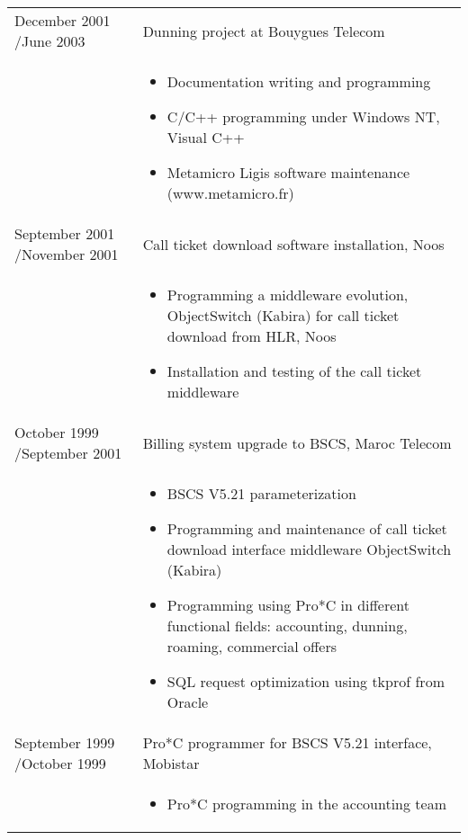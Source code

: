 \documentclass[a4paper,11pt]{letter}
\begin{document}
\begin{tabular}{p{}p{}}
December 2001 \slash June 2003 & Dunning project at Bouygues Telecom \\
	

& \begin{itemize}
\item     Documentation writing and programming 
\item     C/C++ programming under Windows NT, Visual C++
\item     Metamicro Ligis software maintenance (www.metamicro.fr)
\end{itemize} \\
	

September 2001 \slash November 2001 & Call ticket download software installation, Noos \\

& \begin{itemize}
\item     Programming a middleware evolution, ObjectSwitch (Kabira) for call ticket download from HLR, Noos
\item     Installation and  testing of the call ticket middleware 
\end{itemize} \\


October 1999 \slash September 2001 & Billing system upgrade to BSCS, Maroc Telecom \\
	

& \begin{itemize}
\item     BSCS V5.21 parameterization
\item     Programming and maintenance of call ticket download interface middleware ObjectSwitch (Kabira)
\item     Programming using Pro*C in different functional fields: accounting, dunning, roaming, commercial offers 
\item     SQL request optimization using tkprof from Oracle
\end{itemize} \\


September 1999 \slash October 1999 & Pro*C programmer for BSCS V5.21 interface, Mobistar \\
	
& \begin{itemize}
\item Pro*C programming in the accounting team
\end{itemize} \\

\end{tabular}
\end{document}
